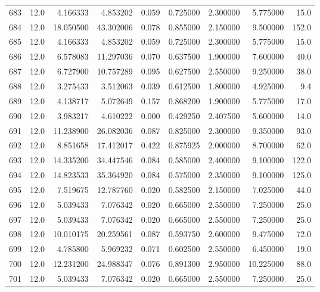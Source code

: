 \begin{tabular}{lrrrrrrrr}
683  &   12.0 &   4.166333 &   4.853202 &  0.059 &  0.725000 &  2.300000 &   5.775000 &   15.0 \\
684  &   12.0 &  18.050500 &  43.302006 &  0.078 &  0.855000 &  2.150000 &   9.500000 &  152.0 \\
685  &   12.0 &   4.166333 &   4.853202 &  0.059 &  0.725000 &  2.300000 &   5.775000 &   15.0 \\
686  &   12.0 &   6.578083 &  11.297036 &  0.070 &  0.637500 &  1.900000 &   7.600000 &   40.0 \\
687  &   12.0 &   6.727900 &  10.757289 &  0.095 &  0.627500 &  2.550000 &   9.250000 &   38.0 \\
688  &   12.0 &   3.275433 &   3.512063 &  0.039 &  0.612500 &  1.800000 &   4.925000 &    9.4 \\
689  &   12.0 &   4.138717 &   5.072649 &  0.157 &  0.868200 &  1.900000 &   5.775000 &   17.0 \\
690  &   12.0 &   3.983217 &   4.610222 &  0.000 &  0.429250 &  2.407500 &   5.600000 &   14.0 \\
691  &   12.0 &  11.238900 &  26.082036 &  0.087 &  0.825000 &  2.300000 &   9.350000 &   93.0 \\
692  &   12.0 &   8.851658 &  17.412017 &  0.422 &  0.875925 &  2.000000 &   8.700000 &   62.0 \\
693  &   12.0 &  14.335200 &  34.447546 &  0.084 &  0.585000 &  2.400000 &   9.100000 &  122.0 \\
694  &   12.0 &  14.823533 &  35.364920 &  0.084 &  0.575000 &  2.350000 &   9.100000 &  125.0 \\
695  &   12.0 &   7.519675 &  12.787760 &  0.020 &  0.582500 &  2.150000 &   7.025000 &   44.0 \\
696  &   12.0 &   5.039433 &   7.076342 &  0.020 &  0.665000 &  2.550000 &   7.250000 &   25.0 \\
697  &   12.0 &   5.039433 &   7.076342 &  0.020 &  0.665000 &  2.550000 &   7.250000 &   25.0 \\
698  &   12.0 &  10.010175 &  20.259561 &  0.087 &  0.593750 &  2.600000 &   9.475000 &   72.0 \\
699  &   12.0 &   4.785800 &   5.969232 &  0.071 &  0.602500 &  2.550000 &   6.450000 &   19.0 \\
700  &   12.0 &  12.231200 &  24.988347 &  0.076 &  0.891300 &  2.950000 &  10.225000 &   88.0 \\
701  &   12.0 &   5.039433 &   7.076342 &  0.020 &  0.665000 &  2.550000 &   7.250000 &   25.0 \\

\end{tabular}
